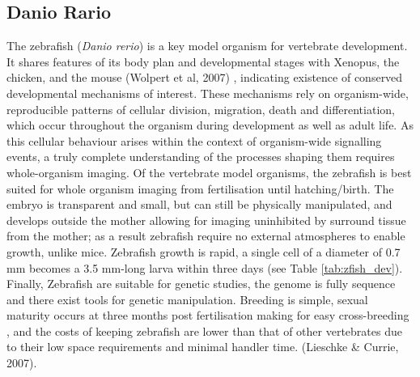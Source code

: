 \subsection{Danio Rario}
The zebrafish (\emph{Danio rerio}) is a key model organism for vertebrate development.
It shares features of its body plan and developmental stages with Xenopus, the chicken, and the mouse \cite{?} (Wolpert et al, 2007)
, indicating existence of conserved developmental mechanisms of interest.
These mechanisms rely on organism-wide, reproducible patterns of cellular division, migration, death and differentiation, which occur throughout the organism during development as well as adult life.
As this cellular behaviour arises within the context of organism-wide signalling events, a truly complete understanding of the processes shaping them requires whole-organism imaging.
Of the vertebrate model organisms, the zebrafish is best suited for whole organism imaging from fertilisation until hatching/birth.
The embryo is transparent and small, but can still be physically manipulated, and develops outside the mother allowing for imaging uninhibited by surround tissue from the mother; as a result zebrafish require no external atmospheres to enable growth, unlike mice.
Zebrafish growth is rapid, a single cell of a diameter of 0.7 mm becomes a 3.5 mm-long larva within three days (see Table \ref{tab:zfish_dev}).
Finally, Zebrafish are suitable for genetic studies, the genome is fully sequence and there exist tools for genetic manipulation.
Breeding is simple, sexual maturity occurs at three months post fertilisation making for easy cross-breeding \cite{?} %
, and the costs of keeping zebrafish are lower than that of other vertebrates due to their low space requirements and minimal handler time. \cite{?} (Lieschke \& Currie, 2007).

